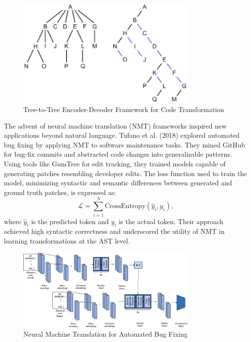 \documentclass{dhbenelux}
\begin{document}
\begin{figure}[h]
    \centering
    \includegraphics[width=0.8\textwidth]{Images/2.png} %
    \caption{Tree-to-Tree Encoder-Decoder Framework for Code Transformation}
    \label{fig:tree-encoder-decoder}
\end{figure}

The advent of neural machine translation (NMT) frameworks inspired new applications beyond natural language. Tufano et al. (2018) explored automated bug fixing by applying NMT to software maintenance tasks. They mined GitHub for bug-fix commits and abstracted code changes into generalizable patterns. Using tools like GumTree for edit tracking, they trained models capable of generating patches resembling developer edits. The loss function used to train the model, minimizing syntactic and semantic differences between generated and ground truth patches, is expressed as:
\begin{equation}
\mathcal{L} = \sum_{i=1}^N \text{CrossEntropy}(\hat{y}_i, y_i),
\end{equation}
where \( \hat{y}_i \) is the predicted token and \( y_i \) is the actual token. Their approach achieved high syntactic correctness and underscored the utility of NMT in learning transformations at the AST level.

\begin{figure}[h]
    \centering
    \includegraphics[width=0.8\textwidth]{Images/3.png} %
    \caption{Neural Machine Translation for Automated Bug Fixing}
    \label{fig:nmt-bug-fixing}
\end{figure}
\end{document}
